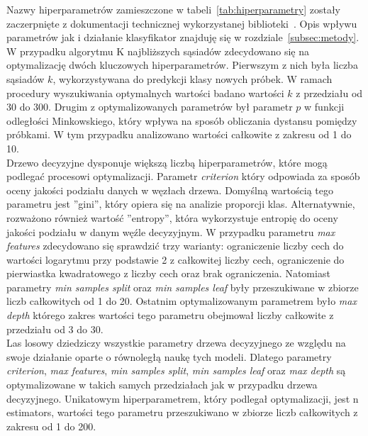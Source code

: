 \documentclass[a4paper,twoside,12pt]{book}
\begin{document}
Nazwy hiperparametrów zamieszczone w tabeli~\ref{tab:hiperparametry} zostały zaczerpnięte z dokumentacji technicznej wykorzystanej biblioteki~\cite{sklearn_api}. Opis wpływu parametrów jak i działanie klasyfikator znajduję się w rozdziale~\ref{subsec:metody}.\\

W przypadku algorytmu K najbliższych sąsiadów zdecydowano się na optymalizację dwóch kluczowych hiperparametrów. Pierwszym z nich była liczba sąsiadów $k$, wykorzystywana do predykcji klasy nowych próbek. W ramach procedury wyszukiwania optymalnych wartości badano wartości $k$ z przedziału od 30 do 300. Drugim z optymalizowanych parametrów był parametr $p$ w funkcji odległości Minkowskiego, który wpływa na sposób obliczania dystansu pomiędzy próbkami. W tym przypadku analizowano wartości całkowite z zakresu od 1 do 10.\\

Drzewo decyzyjne dysponuje większą liczbą hiperparametrów, które mogą podlegać procesowi optymalizacji. Parametr \textit{criterion} który odpowiada za sposób oceny jakości podziału danych w węzłach drzewa. Domyślną wartością tego parametru jest ''gini'', który opiera się na analizie proporcji klas. Alternatywnie, rozważono również wartość ''entropy'', która wykorzystuje entropię do oceny jakości podziału w danym węźle decyzyjnym.
W przypadku parametru \textit{max features} zdecydowano się sprawdzić trzy warianty: ograniczenie liczby cech do wartości logarytmu przy podstawie 2 z całkowitej liczby cech, ograniczenie do pierwiastka kwadratowego z liczby cech oraz brak ograniczenia. Natomiast parametry \textit{min samples split} oraz \textit{min samples leaf} były przeszukiwane w zbiorze liczb całkowitych od 1 do 20.
Ostatnim optymalizowanym parametrem było \textit{max depth} którego zakres wartości tego parametru obejmował liczby całkowite z przedziału od 3 do 30.\\

Las losowy dziedziczy wszystkie parametry drzewa decyzyjnego ze względu na swoje działanie oparte o równoległą naukę tych modeli. Dlatego parametry \textit{criterion},  \textit{max features},  \textit{min samples split}, \textit{min samples leaf} oraz \textit{max depth} są optymalizowane w takich samych przedziałach jak w przypadku drzewa decyzyjnego.
Unikatowym hiperparametrem, który podlegał optymalizacji, jest n estimators, wartości tego parametru przeszukiwano w zbiorze liczb całkowitych z zakresu od 1 do 200.\\
\end{document}

